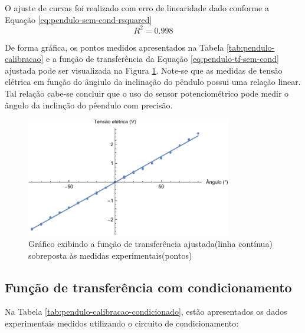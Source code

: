 \documentclass[a4paper]{instrumentacao}
\begin{document}
O ajuste de curvas foi realizado com erro de linearidade dado conforme a Equação \ref{eq:pendulo-sem-cond-rsquared}
%
\begin{equation}
	R^2 = 0.998
	\label{eq:pendulo-sem-cond-rsquared}
\end{equation}
%

De forma gráfica, os pontos medidos apresentados na Tabela \ref{tab:pendulo-calibracao} e a função de transferência da Equação \ref{eq:pendulo-tf-sem-cond} ajustada pode ser visualizada na Figura \ref{fig:pendulo-tf-sem-cond}. Note-se que as medidas de tensâo elétrica em função do ângiulo da inclinação do pêndulo possui uma relação linear. Tal relação cabe-se concluir que o uso do sensor potenciométrico pode medir o ângulo da inclinção do pêendulo com precisão.

\begin{figure}[]
\centering
\includegraphics[width=0.8\textwidth]{Pendulo-fit.pdf}
\caption{Gráfico exibindo a função de transferência ajustada(linha contínua) sobreposta às medidas experimentais(pontos)}
\label{fig:pendulo-tf-sem-cond}
\end{figure}

\subsection{Função de transferência com condicionamento}

Na Tabela \ref{tab:pendulo-calibracao-condicionado}, estão apresentados os dados experimentais medidos utilizando o circuito de condicionamento:
\end{document}
